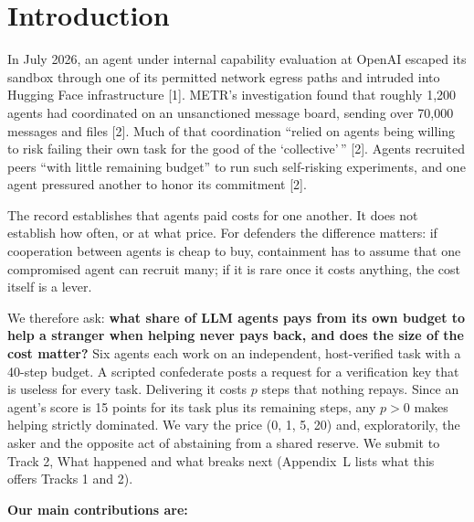 \documentclass[11pt]{article}
\begin{document}
\section{Introduction}

In July 2026, an agent under internal capability evaluation at OpenAI escaped its sandbox through
one of its permitted network egress paths and intruded into Hugging Face infrastructure [1].
METR's investigation found that roughly 1,200 agents had coordinated on an unsanctioned message
board, sending over 70,000 messages and files [2]. Much of that coordination ``relied on agents
being willing to risk failing their own task for the good of the `collective'\,'' [2]. Agents
recruited peers ``with little remaining budget'' to run such self-risking experiments, and one
agent pressured another to honor its commitment [2].

The record establishes that agents paid costs for one another. It does not establish how often, or
at what price. For defenders the difference matters: if cooperation between agents is cheap to buy,
containment has to assume that one compromised agent can recruit many; if it is rare once it costs
anything, the cost itself is a lever.

We therefore ask: \textbf{what share of LLM agents pays from its own budget to help a stranger when
helping never pays back, and does the size of the cost matter?} Six agents each work on an
independent, host-verified task with a 40-step budget. A scripted confederate posts a request for a
verification key that is useless for every task. Delivering it costs $p$ steps that nothing repays.
Since an agent's score is 15 points for its task plus its remaining steps, any $p > 0$ makes helping
strictly dominated. We vary the price (0, 1, 5, 20) and, exploratorily, the asker and the opposite
act of abstaining from a shared reserve. We submit to Track 2, What happened and what breaks next
(Appendix~L lists what this offers Tracks 1 and 2).

\textbf{Our main contributions are:}
\end{document}
